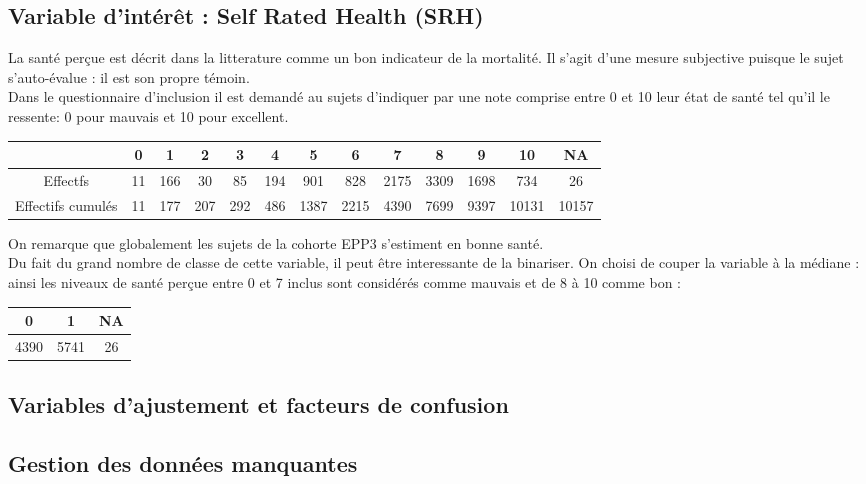 \documentclass{book}
\begin{document}
\subsection{Variable d'intérêt : Self Rated Health (SRH)}
\noindent
La santé perçue est décrit dans la litterature comme un bon indicateur de la mortalité. Il s'agit d'une mesure subjective puisque le sujet s'auto-évalue : il est son propre témoin.\\
Dans le questionnaire d'inclusion il est demandé au sujets d'indiquer par une note comprise entre 0 et 10 leur état de santé tel qu'il le ressente: 0 pour mauvais et 10 pour excellent.\\

\begin{center}
\setlength\arrayrulewidth{.6pt}
\begin{tabular}{|c||c|c|c|c|c|c|c|c|c|c|c|c|}
\hline
 & 0 & 1 & 2 & 3 & 4 & 5 & 6 & 7 & 8 & 9 & 10 & NA\\
 \hline
 \hline
Effectfs & 11 & 166 &  30  & 85 & 194 & 901 & 828 & 2175 & 3309 & 1698 &  734 &  26\\ 
\hline
Effectifs cumulés & 11 &  177  & 207 &  292 &  486 & 1387 & 2215 & 4390&  7699 & 9397 &10131 &10157\\ 
\hline
\end{tabular}
\end{center}

\noindent
On remarque que globalement les sujets de la cohorte EPP3 s'estiment en bonne santé.\\
Du fait du grand nombre de classe de cette variable, il peut être interessante de la binariser. On choisi de couper la variable à la médiane : ainsi les niveaux de santé perçue entre 0 et 7 inclus sont considérés comme mauvais et de 8 à 10 comme bon : \\
\begin{center}
\setlength\arrayrulewidth{.6pt}
\begin{tabular}{|c|c|c|}
\hline
  0  &  1& NA \\
  \hline
  \hline 
4390& 5741&   26\\
\hline 
\end{tabular}
\end{center}
\subsection{Variables d'ajustement et facteurs de confusion}
\subsection{Gestion des données manquantes}
\end{document}
